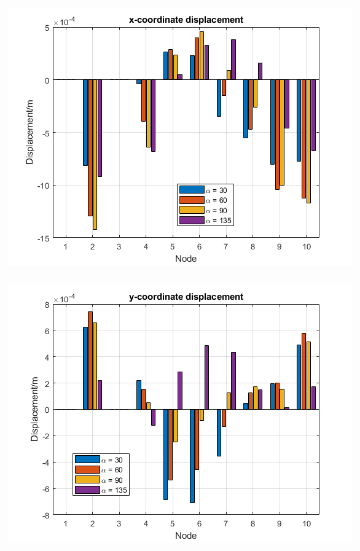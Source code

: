 \documentclass[11pt]{article}
\begin{document}
\begin{figure}[H]
    \centering
    \begin{subfigure}{.5\textwidth}
        \centering
        \includegraphics[width=\linewidth]{img/fig5}
        \caption{}
    \end{subfigure}%
    \begin{subfigure}{.5\textwidth}
        \centering
        \includegraphics[width=\linewidth]{img/fig6}
        \caption{}
    \end{subfigure}
    \caption{}
    \label{fig:case2}
\end{figure}
\end{document}
